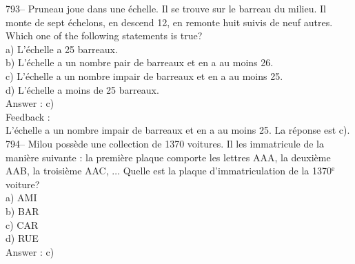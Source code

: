 ﻿\documentclass[letterpaper, 12pt]{article}
\begin{document}
793-- Pruneau joue dans une \'echelle.  Il se trouve sur le barreau du
milieu.  Il monte de sept \'echelons, en descend 12, en remonte huit suivis
de neuf autres.  Which one of the following statements is true?\\
a) L'\'echelle a 25 barreaux.\\
b) L'\'echelle a un nombre pair de barreaux et en a au moins 26.\\
c) L'\'echelle a un nombre impair de barreaux et en a au moins 25.\\
d) L'\'echelle a moins de 25 barreaux.\\

Answer : c)\\

Feedback : \\
L'\'echelle a un nombre impair de barreaux et en a au moins 25.  La
r\'eponse est c).\\

794-- Milou poss\`ede une collection de 1370 voitures.  Il les immatricule
de la mani\`ere suivante : la premi\`ere plaque comporte les lettres AAA, la
deuxi\`eme AAB, la troisi\`eme AAC, $\ldots$  Quelle est la plaque
d'immatriculation de la 1370$^{\textrm{e}}$ voiture?\\
a) AMI\\
b) BAR\\
c) CAR\\
d) RUE\\

Answer : c)\\
\end{document}

